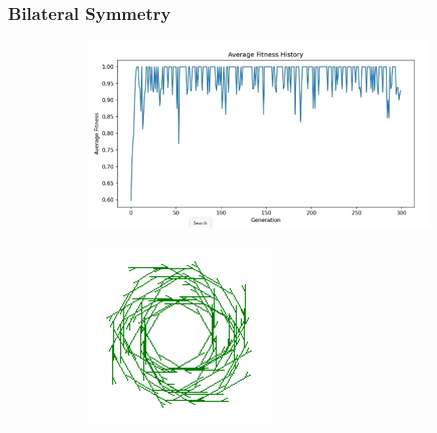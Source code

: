 \subsubsection{Bilateral Symmetry}
\begin{figure}[H]
    \centering
    \begin{subfigure}[b]{0.3\textwidth}
        \includegraphics[width=\textwidth]{Sym_only_oa.png}
    \end{subfigure}
    \begin{subfigure}[b]{0.1\textwidth}
        \includegraphics[width=\textwidth]{symm_only_dr.png}

\end{subfigure}
\end{figure}
